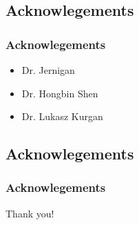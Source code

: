 \documentclass{beamer}
\begin{document}
\subsection{Acknowlegements}
\begin{frame}
  \frametitle{Acknowlegements}
  \begin{itemize}
    \item Dr. Jernigan
    \item Dr. Hongbin Shen
    \item Dr. Lukasz Kurgan
  \end{itemize}
\end{frame}

\subsection{Acknowlegements}
\begin{frame}
  \frametitle{Acknowlegements}
  \begin{center}
  {\LARGE Thank you!}
  \vspace{5px}
  \end{center}
\end{frame}
\end{document}
